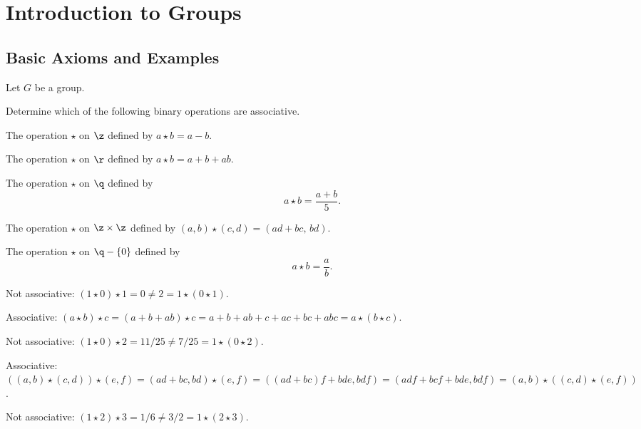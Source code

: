 \section{Introduction to Groups}

\subsection{Basic Axioms and Examples}

Let $G$ be a group.

\begin{exercise}\label{ex1.1.1}
    Determine which of the following binary operations are associative.
    \begin{subproblems}
        \item The operation $\star$ on $\z$ defined by $a \star b = a - b$.
        \item The operation $\star$ on $\r$ defined by $a \star b = a + b + ab$.
        \item The operation $\star$ on $\q$ defined by
        \[a \star b = \dfrac{a + b}{5}.\]
        \item The operation $\star$ on $\z \times \z$ defined by $(a,b) \star (c,d) = (ad + bc, \, bd)$.
        \item The operation $\star$ on $\q - \{0\}$ defined by
        \[a \star b = \dfrac{a}{b}.\]
    \end{subproblems}
\end{exercise}

\begin{solalph}
    \item Not associative: $(1 \star 0) \star 1 = 0 \neq 2 = 1 \star (0 \star 1)$.
    \item Associative: $(a \star b) \star c = (a + b + ab) \star c = a + b + ab + c + ac + bc + abc = a \star (b \star c)$.
    \item Not associative: $(1 \star 0) \star 2 = 11/25 \neq 7/25 = 1 \star (0 \star 2)$.
    \item Associative: $((a,b) \star (c,d)) \star (e,f) = (ad + bc, bd) \star (e,f) = ((ad + bc)f + bde, bdf) = (adf + bcf + bde, bdf) = (a,b) \star ((c,d) \star (e,f))$.
    \item Not associative: $(1 \star 2) \star 3 = 1/6 \neq 3/2 = 1 \star (2 \star 3)$.
\end{solalph}

